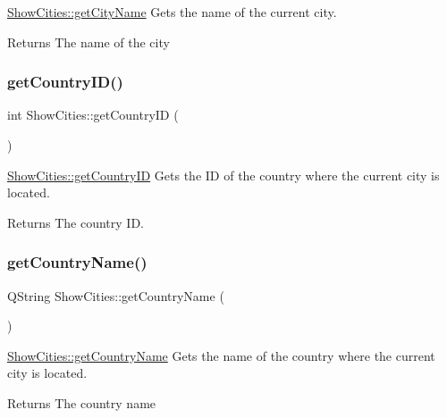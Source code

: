\mbox{\hyperlink{class_show_cities_a3640b91c66939d0070c3dd6f5b9eb93c}{Show\+Cities\+::get\+City\+Name}} Gets the name of the current city. 

\begin{DoxyReturn}{Returns}
The name of the city 
\end{DoxyReturn}
\mbox{\label{class_show_cities_a8f66380734928e926a732a0088c1d998}} 
\subsubsection{\texorpdfstring{get\+Country\+I\+D()}{getCountryID()}}
{\footnotesize\ttfamily int Show\+Cities\+::get\+Country\+ID (\begin{DoxyParamCaption}{ }\end{DoxyParamCaption})}



\mbox{\hyperlink{class_show_cities_a8f66380734928e926a732a0088c1d998}{Show\+Cities\+::get\+Country\+ID}} Gets the ID of the country where the current city is located. 

\begin{DoxyReturn}{Returns}
The country ID. 
\end{DoxyReturn}
\mbox{\label{class_show_cities_a93cf32e7ef19a182d0022c9c888392aa}} 
\subsubsection{\texorpdfstring{get\+Country\+Name()}{getCountryName()}}
{\footnotesize\ttfamily Q\+String Show\+Cities\+::get\+Country\+Name (\begin{DoxyParamCaption}{ }\end{DoxyParamCaption})}



\mbox{\hyperlink{class_show_cities_a93cf32e7ef19a182d0022c9c888392aa}{Show\+Cities\+::get\+Country\+Name}} Gets the name of the country where the current city is located. 

\begin{DoxyReturn}{Returns}
The country name 
\end{DoxyReturn}
\mbox{\label{class_show_cities_acd17480ad6a64e989e9aa0b07d30141b}} 

